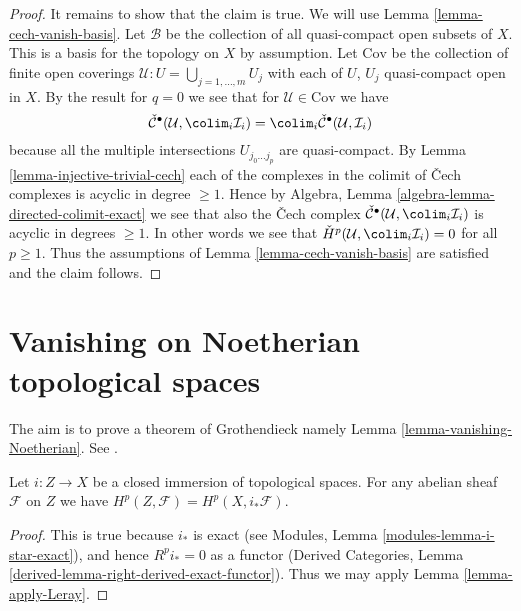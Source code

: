 \begin{proof}
\medskip\noindent
It remains to show that the claim is true. We will use
Lemma \ref{lemma-cech-vanish-basis}.
Let $\mathcal{B}$ be the collection of all quasi-compact open
subsets of $X$. This is a basis for the topology on $X$ by assumption.
Let $\text{Cov}$ be the collection of finite open coverings
$\mathcal{U} : U = \bigcup_{j = 1, \ldots, m} U_j$ with each
of $U$, $U_j$ quasi-compact open in $X$. By the result for $q = 0$
we see that for $\mathcal{U} \in \text{Cov}$ we have
$$
\check{\mathcal{C}}^\bullet(\mathcal{U}, \colim_i \mathcal{I}_i)
=
\colim_i \check{\mathcal{C}}^\bullet(\mathcal{U}, \mathcal{I}_i)
$$
because all the multiple intersections $U_{j_0 \ldots j_p}$
are quasi-compact. By Lemma \ref{lemma-injective-trivial-cech}
each of the complexes in the colimit of {\v C}ech complexes is
acyclic in degree $\geq 1$. Hence by
Algebra, Lemma \ref{algebra-lemma-directed-colimit-exact}
we see that also the {\v C}ech complex
$\check{\mathcal{C}}^\bullet(\mathcal{U}, \colim_i \mathcal{I}_i)$
is acyclic in degrees $\geq 1$. In other words we see that
$\check{H}^p(\mathcal{U},  \colim_i \mathcal{I}_i) = 0$
for all $p \geq 1$. Thus the assumptions of
Lemma \ref{lemma-cech-vanish-basis} are satisfied and the claim follows.
\end{proof}











\section{Vanishing on Noetherian topological spaces}
\label{section-vanishing-Noetherian}

\noindent
The aim is to prove a theorem of Grothendieck namely
Lemma \ref{lemma-vanishing-Noetherian}. See \cite{Tohoku}.

\begin{lemma}
\label{lemma-cohomology-and-closed-immersions}
Let $i : Z \to X$ be a closed immersion of topological spaces.
For any abelian sheaf $\mathcal{F}$ on $Z$ we have
$H^p(Z, \mathcal{F}) = H^p(X, i_*\mathcal{F})$.
\end{lemma}

\begin{proof}
This is true because $i_*$ is exact (see
Modules, Lemma \ref{modules-lemma-i-star-exact}),
and hence $R^pi_* = 0$ as a functor
(Derived Categories, Lemma \ref{derived-lemma-right-derived-exact-functor}).
Thus we may apply Lemma \ref{lemma-apply-Leray}.
\end{proof}

